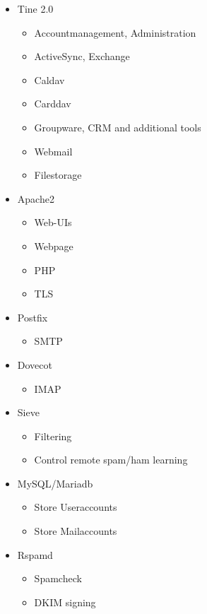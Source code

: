 \documentclass{beamer}
\begin{document}
	\begin{frame}{\insertsection}{\insertsubsection}
		\vspace{-0.5cm}
		
		\begin{itemize}
			\item Tine 2.0
			\begin{itemize}
				\item Accountmanagement, Administration
				\item ActiveSync, Exchange
				\item Caldav
				\item Carddav
				\item Groupware, CRM and additional tools
				\item Webmail
				\item Filestorage
			\end{itemize}
			\item Apache2
			\begin{itemize}
				\item Web-UIs
				\item Webpage
				\item PHP
				\item TLS
			\end{itemize}			
			\item Postfix
			\begin{itemize}
				\item SMTP
			\end{itemize}			
			\item Dovecot
			\begin{itemize}
				\item IMAP
			\end{itemize}
			\item Sieve
			\begin{itemize}
				\item Filtering
				\item Control remote spam/ham learning
			\end{itemize}
			\item MySQL/Mariadb
			\begin{itemize}
				\item Store Useraccounts
				\item Store Mailaccounts
			\end{itemize}
			\item Rspamd
			\begin{itemize}
				\item Spamcheck
				\item DKIM signing

\end{itemize}
\end{itemize}
\end{frame}
\end{document}
